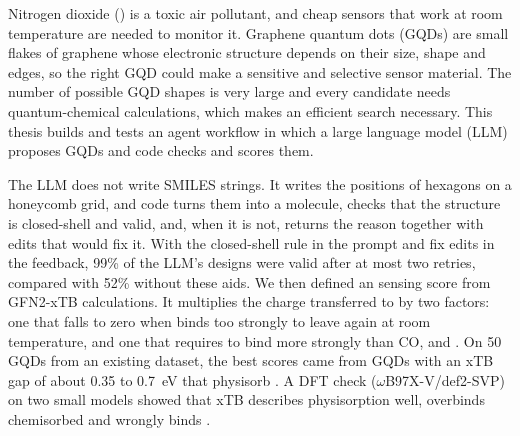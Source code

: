 
Nitrogen dioxide () is a toxic air pollutant, and cheap sensors that work at room
temperature are needed to monitor it. Graphene quantum dots (GQDs) are small flakes of graphene
whose electronic structure depends on their size, shape and edges, so the right GQD could make a
sensitive and selective sensor material. The number of possible GQD shapes is very large and every
candidate needs quantum-chemical calculations, which makes an efficient search necessary. This
thesis builds and tests an agent workflow in which a large language model (LLM) proposes GQDs and
code checks and scores them.

The LLM does not write SMILES strings. It writes the positions of hexagons on a honeycomb grid,
and code turns them into a molecule, checks that the structure is closed-shell and valid, and,
when it is not, returns the reason together with edits that would fix it. With the closed-shell
rule in the prompt and fix edits in the feedback, 99\% of the LLM's designs were valid after at
most two retries, compared with 52\% without these aids. We then defined an  sensing score
from GFN2-xTB calculations. It multiplies the charge transferred to  by two factors: one
that falls to zero when  binds too strongly to leave again at room temperature, and one
that requires  to bind more strongly than CO,  and . On 50 GQDs from an
existing dataset, the best scores came from GQDs with an xTB gap of about 0.35 to 0.7~eV that
physisorb . A DFT check (\(\omega\)B97X-V/def2-SVP) on two small models showed that xTB
describes physisorption well, overbinds chemisorbed  and wrongly binds .

